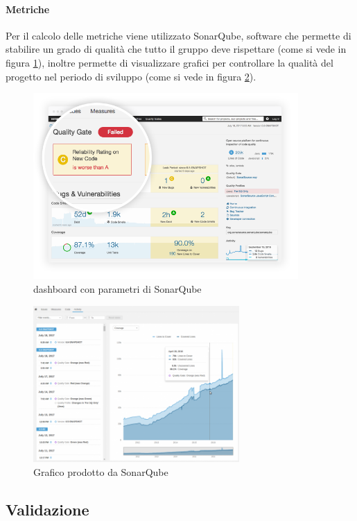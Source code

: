 \paragraph{Metriche} \Spazio
Per il calcolo delle metriche viene utilizzato SonarQube, software che permette di stabilire un grado di qualità che tutto il gruppo deve rispettare (come si vede in figura \ref{qualità}), inoltre permette di visualizzare grafici per controllare la qualità del progetto nel periodo di sviluppo (come si vede in figura \ref{graficobello}).
\begin{figure}[!h]
	\centering
	\includegraphics[width=0.9\textwidth]{images/enforce-quality-gate.png}
	\caption{dashboard con parametri di SonarQube}
	\label{qualità}
\end{figure}
\begin{figure}[!h]
	\centering
	\includegraphics[width=0.7\textwidth]{images/project-history2.png}
	\caption{Grafico prodotto da SonarQube}
	\label{graficobello}
\end{figure}
\newpage
\subsection{Validazione}

